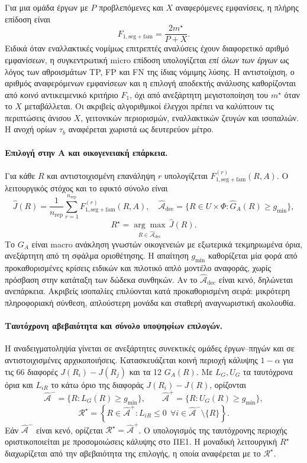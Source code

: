\documentclass[11pt,a4paper]{article}
\begin{document}
Για μια ομάδα έργων με $P$ προβλεπόμενες και $X$ αναφερόμενες εμφανίσεις, η πλήρης επίδοση είναι
\[
F_{1,\mathrm{seg+fam}}=\frac{2m^\star}{P+X}.
\]
Ειδικά όταν εναλλακτικές νομίμως επιτρεπτές αναλύσεις έχουν διαφορετικό αριθμό εμφανίσεων, η συγκεντρωτική $\mathrm{micro}$ επίδοση υπολογίζεται \emph{επί όλων των έργων} ως λόγος των αθροισμάτων TP, FP και FN της ίδιας νόμιμης λύσης. Η αντιστοίχιση, ο αριθμός αναφερόμενων εμφανίσεων και η επιλογή αποδεκτής ανάλυσης καθορίζονται από \emph{κοινό} αντικειμενικό κριτήριο $F_1$, όχι από ανεξάρτητη μεγιστοποίηση του $m^\star$ όταν το $X$ μεταβάλλεται. Οι ακριβείς αλγοριθμικοί έλεγχοι πρέπει να καλύπτουν τις περιπτώσεις άνισου $X$, γειτονικών περιορισμών, εναλλακτικών ζευγών και ισοπαλιών. Η ανοχή ορίων $\tau_b$ αναφέρεται χωριστά ως δευτερεύον μέτρο.

\paragraph{Επιλογή στην A και οικογενειακή επάρκεια.}
Για κάθε $R$ και αντιστοιχισμένη επανάληψη $r$ υπολογίζεται $F_{1,\mathrm{seg+fam}}^{(r)}(R,A)$. Ο λειτουργικός στόχος και το εφικτό σύνολο είναι
\[
\widehat J(R)=\frac{1}{n_{\mathrm{rep}}}\sum_{r=1}^{n_{\mathrm{rep}}}F_{1,\mathrm{seg+fam}}^{(r)}(R,A),\quad
\widehat{\mathcal A}_{\mathrm{dec}}=\{R\in U\times\Phi:\widehat G_A(R)\ge g_{\min}\},
\]
\[
R^\star=\underset{R\in\widehat{\mathcal A}_{\mathrm{dec}}}{\arg\max}\,\widehat J(R).
\]
Το $G_A$ είναι macro ανάκληση γνωστών οικογενειών με εξωτερικά τεκμηριωμένα όρια, ανεξάρτητη από τη σφάλμα οριοθέτησης. Η απαίτηση $g_{\min}$ καθορίζεται μία φορά από προκαθορισμένες κρίσεις ειδικών και πιλοτικό απλό μοντέλο αναφοράς, χωρίς πρόσβαση στην κατάταξη των δώδεκα συνθηκών. Αν το $\widehat{\mathcal A}_{\mathrm{dec}}$ είναι κενό, δηλώνεται ανεπάρκεια. Ακριβείς ισοπαλίες επιλύονται κατά προκαθορισμένη σειρά: μικρότερη πληροφοριακή σύνθεση, απλούστερη μονάδα και σταθερή αναγνωριστική ακολουθία.

\paragraph{Ταυτόχρονη αβεβαιότητα και σύνολο υποψηφίων επιλογών.}
Η αναδειγματοληψία γίνεται σε ανεξάρτητες συνεκτικές ομάδες έργων--πηγών και σε αντιστοιχισμένες αρχικοποιήσεις. Κατασκευάζεται κοινή περιοχή κάλυψης $1-\alpha$ για τις 66 διαφορές $J(R_i)-J(R_j)$ και τα 12 $G_A(R)$. Με $L_G,U_G$ τα ταυτόχρονα όρια και $L_{iR}$ το κάτω όριο της διαφοράς $J(R_i)-J(R)$, ορίζονται
\[
\widehat{\mathcal A}^{-}=\{R:L_G(R)\ge g_{\min}\},\qquad
\widehat{\mathcal A}^{+}=\{R:U_G(R)\ge g_{\min}\},
\]
\[
\mathcal R^\star=\left\{R\in\widehat{\mathcal A}^{+}:L_{iR}\le0\ \ \forall i\in\widehat{\mathcal A}^{-}\setminus\{R\}\right\}.
\]
Εάν $\widehat{\mathcal A}^{-}$ είναι κενό, ορίζεται $\mathcal R^\star=\widehat{\mathcal A}^{+}$. Ο υπολογισμός της ταυτόχρονης περιοχής οριστικοποιείται με προσομοιώσεις κάλυψης στο ΠΕ1. Η μοναδική λειτουργική $R^\star$ διαχωρίζεται από την αβεβαιότητα της επιλογής, η οποία αναφέρεται με το $\mathcal R^\star$.
\end{document}
